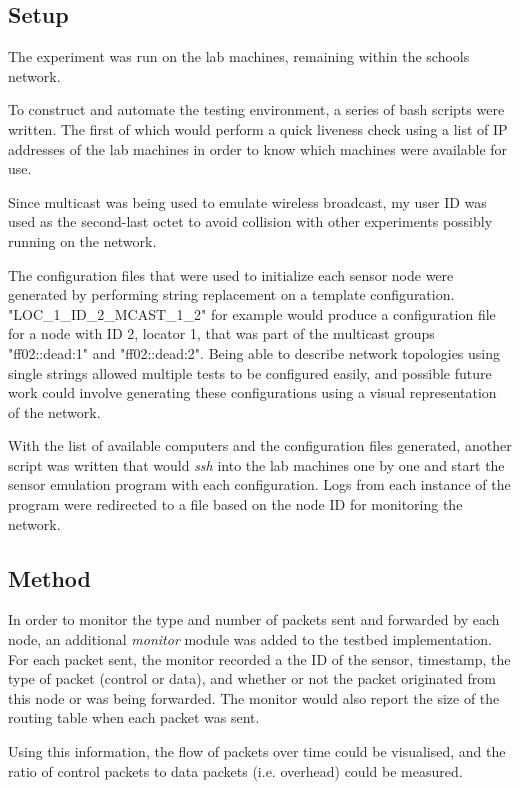 \documentclass[12pt]{article}
\begin{document}
\subsection{Setup}

The experiment was run on the lab machines, remaining within the schools network. 

To construct and automate the testing environment, a series of bash scripts were written. The first of which would perform a quick liveness check using a list of IP addresses of the lab machines in order to know which machines were available for use.

Since multicast was being used to emulate wireless broadcast, my user ID was used as the second-last octet to avoid collision with other experiments possibly running on the network.

The configuration files that were used to initialize each sensor node were generated by performing string replacement on a template configuration. "LOC\_1\_ID\_2\_MCAST\_1\_2" for example would produce a configuration file for a node with ID 2, locator 1, that was part of the multicast groups "ff02::dead:1" and "ff02::dead:2". Being able to describe network topologies using single strings allowed multiple tests to be configured easily, and possible future work could involve generating these configurations using a visual representation of the network.

With the list of available computers and the configuration files generated, another script was written that would \emph{ssh} into the lab machines one by one and start the sensor emulation program with each configuration. Logs from each instance of the program were redirected to a file based on the node ID for monitoring the network.

\subsection{Method}

In order to monitor the type and number of packets sent and forwarded by each node, an additional \emph{monitor} module was added to the testbed implementation. For each packet sent, the monitor recorded a the ID of the sensor, timestamp, the type of packet (control or data), and whether or not the packet originated from this node or was being forwarded. The monitor would also report the size of the routing table when each packet was sent. 

Using this information, the flow of packets over time could be visualised, and the ratio of control packets to data packets (i.e. overhead) could be measured. 
\end{document}
